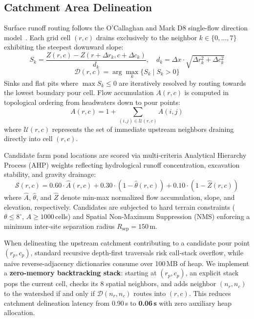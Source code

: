 \documentclass[manuscript,screen,review]{acmart}
\begin{document}
\subsection{Catchment Area Delineation}
Surface runoff routing follows the O'Callaghan and Mark D8 single-flow direction model~\cite{ocallaghan1984}. Each grid cell $(r, c)$ drains exclusively to the neighbor $k \in \{0, \dots, 7\}$ exhibiting the steepest downward slope:
\begin{equation}
    S_k = \frac{Z(r, c) - Z(r + \Delta r_k, c + \Delta c_k)}{d_k}, \quad d_k = \Delta x \cdot \sqrt{\Delta r_k^2 + \Delta c_k^2}
\end{equation}
\begin{equation}
    \mathcal{D}(r, c) = \arg\max_{k} \{S_k \mid S_k > 0\}
\end{equation}
Sinks and flat pits where $\max S_k \le 0$ are iteratively resolved by routing towards the lowest boundary pour cell. Flow accumulation $A(r, c)$ is computed in topological ordering from headwaters down to pour points:
\begin{equation}
    A(r, c) = 1 + \sum_{(i, j) \in \mathcal{U}(r, c)} A(i, j)
\end{equation}
where $\mathcal{U}(r, c)$ represents the set of immediate upstream neighbors draining directly into cell $(r, c)$.

Candidate farm pond locations are scored via multi-criteria Analytical Hierarchy Process (AHP) weights reflecting hydrological runoff concentration, excavation stability, and gravity drainage:
\begin{equation}
    \mathcal{S}(r, c) = 0.60 \cdot \hat{A}(r, c) + 0.30 \cdot (1 - \hat{\theta}(r, c)) + 0.10 \cdot (1 - \hat{Z}(r, c))
\end{equation}
where $\hat{A}$, $\hat{\theta}$, and $\hat{Z}$ denote min-max normalized flow accumulation, slope, and elevation, respectively. Candidates are subjected to hard terrain constraints ($\theta \le 8^\circ$, $A \ge 1000$\,cells) and Spatial Non-Maximum Suppression (NMS) enforcing a minimum inter-site separation radius $R_{\text{sep}} = 150$\,m.

When delineating the upstream catchment contributing to a candidate pour point $(r_p, c_p)$, standard recursive depth-first traversals risk call-stack overflow, while naive reverse-adjacency dictionaries consume over 100\,MB of heap. We implement a \textbf{zero-memory backtracking stack}: starting at $(r_p, c_p)$, an explicit stack pops the current cell, checks its 8 spatial neighbors, and adds neighbor $(n_r, n_c)$ to the watershed if and only if $\mathcal{D}(n_r, n_c)$ routes into $(r, c)$. This reduces catchment delineation latency from 0.90\,s to \textbf{0.06\,s} with zero auxiliary heap allocation.
\end{document}
